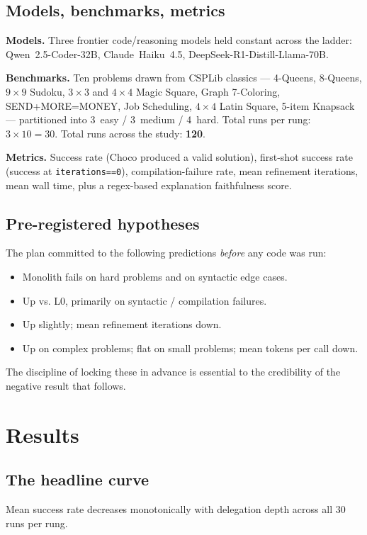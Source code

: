\documentclass[11pt,a4paper]{article}
\begin{document}
\subsection{Models, benchmarks, metrics}
\textbf{Models.} Three frontier code/reasoning models held constant across the
ladder: Qwen~2.5-Coder-32B, Claude~Haiku~4.5, DeepSeek-R1-Distill-Llama-70B.

\textbf{Benchmarks.} Ten problems drawn from CSPLib classics --- 4-Queens,
8-Queens, $9{\times}9$ Sudoku, $3{\times}3$ and $4{\times}4$ Magic Square,
Graph 7-Coloring, SEND+MORE=MONEY, Job Scheduling, $4{\times}4$ Latin Square,
5-item Knapsack --- partitioned into 3~easy / 3~medium / 4~hard. Total runs
per rung: $3 \times 10 = 30$. Total runs across the study: \textbf{120}.

\textbf{Metrics.} Success rate (Choco produced a valid solution), first-shot
success rate (success at \texttt{iterations==0}), compilation-failure rate,
mean refinement iterations, mean wall time, plus a regex-based explanation
faithfulness score.

\subsection{Pre-registered hypotheses}
The plan committed to the following predictions \emph{before} any code was run:
\begin{itemize}[leftmargin=1.2cm,itemsep=1pt,topsep=2pt]
\item[\textbf{H-L0}] Monolith fails on hard problems and on syntactic edge cases.
\item[\textbf{H-L1}] Up vs. L0, primarily on syntactic / compilation failures.
\item[\textbf{H-L2}] Up slightly; mean refinement iterations down.
\item[\textbf{H-L3}] Up on complex problems; flat on small problems; mean tokens per call down.
\end{itemize}
The discipline of locking these in advance is essential to the credibility of
the negative result that follows.

\section{Results}

\subsection{The headline curve}
Mean success rate decreases monotonically with delegation depth across all
30 runs per rung.
\end{document}
